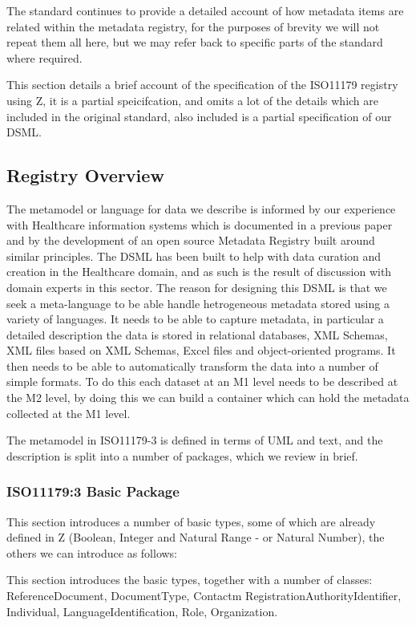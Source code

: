 \documentclass{llncs}
\begin{document}
The standard continues to provide a detailed account of how metadata items are related within the metadata registry, for the purposes of brevity we will not repeat them all here, but we may refer back to specific parts of the standard where required.

This section details a brief account of the specification of the ISO11179 registry using Z, it is a partial speicifcation, and omits a lot of the details which are included in the original standard, also included is a partial specification of our DSML.




\subsection{Registry Overview}

The metamodel or language for data we describe is informed by our experience with Healthcare information systems which is documented in a previous paper \cite{DSMCR} and by the development of an open source Metadata Registry built around similar principles. The DSML has been built to help with data curation and creation in the Healthcare domain, and as such is the result of discussion with domain experts in this sector. The reason for designing this DSML  is that we seek a meta-language to be able handle hetrogeneous metadata stored using a variety of languages. It needs to be able to capture metadata, in particular a detailed description the data is stored in relational databases, XML Schemas, XML files based on XML Schemas, Excel files and object-oriented programs. It then needs to be able to automatically transform the data into a number of simple formats. To do this each dataset at an M1 level needs to be described at the M2 level, by doing this we can build a container which can hold the metadata collected at the M1 level.

The metamodel in ISO11179-3 is defined in terms of UML and text, and the description is split into a number of packages, which we review in brief.
\begin{zed}

\end{zed}


\subsubsection{ISO11179:3 Basic Package}
This section introduces a number of basic types, some of which are already defined in Z (Boolean, Integer and Natural Range - or Natural Number), the others we can introduce as follows:
\begin{zed}
\end{zed}
This section introduces the basic types, together with a number of classes: ReferenceDocument, DocumentType, Contactm RegistrationAuthorityIdentifier, Individual, LanguageIdentification, Role, Organization.
\end{document}
